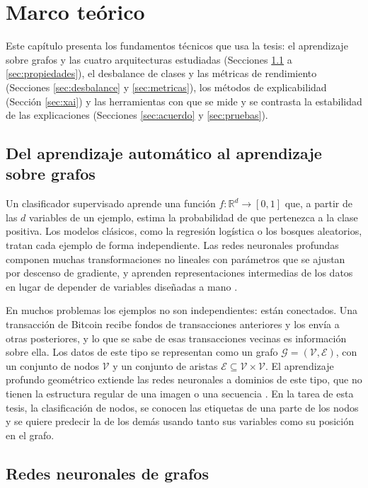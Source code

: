 \chapter{Marco teórico}\label{cap:marco}

Este capítulo presenta los fundamentos técnicos que usa la tesis: el aprendizaje sobre grafos
y las cuatro arquitecturas estudiadas (Secciones \ref{sec:ml} a \ref{sec:propiedades}), el
desbalance de clases y las métricas de rendimiento (Secciones \ref{sec:desbalance} y
\ref{sec:metricas}), los métodos de explicabilidad (Sección \ref{sec:xai}) y las herramientas con
que se mide y se contrasta la estabilidad de las explicaciones (Secciones \ref{sec:acuerdo} y
\ref{sec:pruebas}).

\section{Del aprendizaje automático al aprendizaje sobre grafos}\label{sec:ml}

Un clasificador supervisado aprende una función $f: \mathbb{R}^d \to [0, 1]$ que, a partir de
las $d$ variables de un ejemplo, estima la probabilidad de que pertenezca a la clase positiva.
Los modelos clásicos, como la regresión logística o los bosques aleatorios, tratan cada ejemplo
de forma independiente. Las redes neuronales profundas componen muchas transformaciones no
lineales con parámetros que se ajustan por descenso de gradiente, y aprenden representaciones
intermedias de los datos en lugar de depender de variables diseñadas a mano \cite{LeCun2015DeepLearning}.

En muchos problemas los ejemplos no son independientes: están conectados. Una transacción de
Bitcoin recibe fondos de transacciones anteriores y los envía a otras posteriores, y lo que se
sabe de esas transacciones vecinas es información sobre ella. Los datos de este tipo se
representan como un grafo $\mathcal{G} = (\mathcal{V}, \mathcal{E})$, con un conjunto de nodos
$\mathcal{V}$ y un conjunto de aristas $\mathcal{E} \subseteq \mathcal{V} \times \mathcal{V}$.
El aprendizaje profundo geométrico extiende las redes neuronales a dominios de este tipo, que no
tienen la estructura regular de una imagen o una secuencia \cite{Bronstein2017Geometric}. En la
tarea de esta tesis, la clasificación de nodos, se conocen las etiquetas de una parte de los
nodos y se quiere predecir la de los demás usando tanto sus variables como su posición en el
grafo.

\section{Redes neuronales de grafos}\label{sec:gnn}

